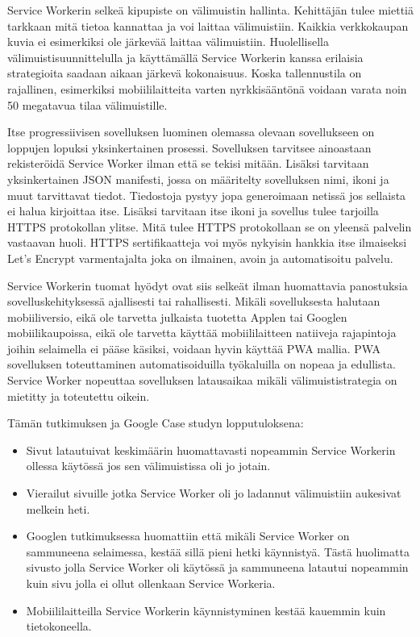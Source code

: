 \documentclass{tktltiki}
\begin{document}
Service Workerin selkeä kipupiste on välimuistin hallinta. Kehittäjän tulee miettiä tarkkaan mitä tietoa kannattaa ja voi laittaa välimuistiin. Kaikkia verkkokaupan kuvia ei esimerkiksi ole järkevää laittaa välimuistiin. Huolellisella välimuistisuunnittelulla ja käyttämällä Service Workerin kanssa erilaisia strategioita saadaan aikaan järkevä kokonaisuus. Koska tallennustila on rajallinen, esimerkiksi mobiililaitteita varten nyrkkisääntönä voidaan varata noin 50 megatavua tilaa välimuistille. \cite{Love}

Itse progressiivisen sovelluksen luominen olemassa olevaan sovellukseen on loppujen lopuksi yksinkertainen prosessi. Sovelluksen tarvitsee ainoastaan rekisteröidä Service Worker ilman että se tekisi mitään. Lisäksi tarvitaan yksinkertainen JSON manifesti, jossa on määritelty sovelluksen nimi, ikoni ja muut tarvittavat tiedot. Tiedostoja pystyy jopa generoimaan netissä jos sellaista ei halua kirjoittaa itse. Lisäksi tarvitaan itse ikoni ja sovellus tulee tarjoilla HTTPS protokollan ylitse. Mitä tulee HTTPS protokollaan se on yleensä palvelin vastaavan huoli. HTTPS sertifikaatteja voi myös nykyisin hankkia itse ilmaiseksi Let's Encrypt varmentajalta joka on ilmainen, avoin ja automatisoitu palvelu.

Service Workerin tuomat hyödyt ovat siis selkeät ilman huomattavia panostuksia sovelluskehityksessä ajallisesti tai rahallisesti. Mikäli sovelluksesta halutaan  mobiiliversio, eikä ole tarvetta julkaista tuotetta Applen tai Googlen mobiilikaupoissa, eikä ole tarvetta käyttää mobiililaitteen natiiveja rajapintoja joihin selaimella ei pääse käsiksi, voidaan hyvin käyttää PWA mallia. PWA sovelluksen toteuttaminen automatisoiduilla työkaluilla on nopeaa ja edullista. Service Worker nopeuttaa sovelluksen latausaikaa mikäli välimuististrategia on mietitty ja toteutettu oikein. 

Tämän tutkimuksen ja Google Case studyn lopputuloksena:

\begin{itemize}
  \item Sivut latautuivat keskimäärin huomattavasti nopeammin Service Workerin ollessa käytössä jos sen välimuistissa oli jo jotain.
  \item Vierailut sivuille jotka Service Worker oli jo ladannut välimuistiin aukesivat melkein heti.
  \item Googlen tutkimuksessa huomattiin että mikäli Service Worker on sammuneena selaimessa, kestää sillä pieni hetki käynnistyä. Tästä huolimatta sivusto jolla Service Worker oli käytössä ja sammuneena latautui nopeammin kuin sivu jolla ei ollut ollenkaan Service Workeria.
  \item Mobiililaitteilla Service Workerin käynnistyminen kestää kauemmin kuin tietokoneella.
\end{itemize}
\end{document}
